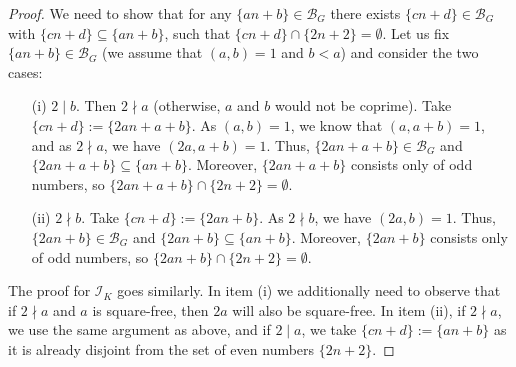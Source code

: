 \documentclass{amsart}
\theoremstyle{definition}
\theoremstyle{definition}
\newcommand{\I}{\mathcal I}
\newcommand{\B}{\mathcal{B}}
\begin{document}
\begin{proof}
We need to show that for any $\{an+b\} \in \B_G$ there exists $\{cn+d\} \in \B_G$ with $\{cn+d\} \subseteq \{an+b\}$, such that $\{cn+d\}\cap \{2n+2\} = \emptyset$. Let us fix $\{an+b\} \in \B_G$ (we assume that $(a,b)=1$ and $b<a$) and consider the two cases:
\begin{itemize}
 \item[(i)] $2\mid b$. Then $2 \nmid a$ (otherwise, $a$ and $b$ would not be coprime). Take $\{cn+d\} := \{2an+a+b\}$. As $(a,b)=1$, we know that $(a,a+b)=1$, and as $2 \nmid a$, we have $(2a,a+b)=1$. Thus, $\{2an+a+b\}\in\B_G$ and $\{2an+a+b\}\subseteq\{an+b\}$. Moreover, $\{2an+a+b\}$ consists only of odd numbers, so $\{2an+a+b\}\cap \{2n+2\} = \emptyset$.
 \item[(ii)] $2\nmid b$. Take $\{cn+d\} := \{2an+b\}$. As $2\nmid b$, we have $(2a,b)=1$. Thus, $\{2an+b\}\in\B_G$ and $\{2an+b\}\subseteq\{an+b\}$. Moreover, $\{2an+b\}$ consists only of odd numbers, so $\{2an+b\}\cap \{2n+2\} = \emptyset$.
\end{itemize}

The proof for $\I_K$ goes similarly. In item (i) we additionally need to observe that if $2 \nmid a$ and $a$ is square-free, then $2a$ will also be square-free. In item (ii), if $2 \nmid a$, we use the same argument as above, and if $2\mid a$, we take $\{cn+d\} := \{an+b\}$ as it is already disjoint from the set of even numbers $\{2n+2\}$.
\end{proof}
\end{document}
